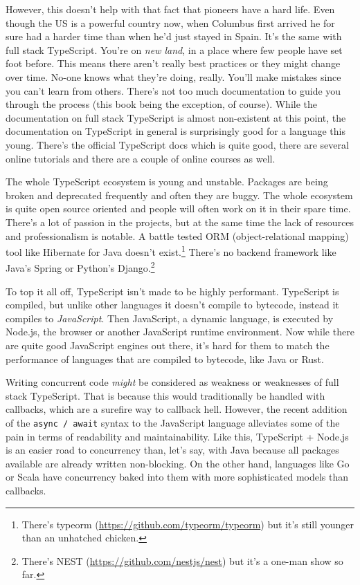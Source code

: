 \documentclass[12pt,a4paper]{report}
\begin{document}
However, this doesn't help with that fact that pioneers have a hard life. Even though the US is a powerful country now, when Columbus first arrived he for sure had a harder time than when he'd just stayed in Spain. It's the same with full stack TypeScript. You're on \textit{new land}, in a place where few people have set foot before. This means there aren't really best practices or they might change over time. No-one knows what they're doing, really. You'll make mistakes since you can't learn from others. There's not too much documentation to guide you through the process (this book being the exception, of course). While the documentation on full stack TypeScript is almost non-existent at this point, the documentation on TypeScript in general is surprisingly good for a language this young. There's the official TypeScript docs which is quite good, there are several online tutorials and there are a couple of online courses as well.

The whole TypeScript ecosystem is young and unstable. Packages are being broken and deprecated frequently and often they are buggy. The whole ecosystem is quite open source oriented and people will often work on it in their spare time. There's a lot of passion in the projects, but at the same time the lack of resources and professionalism is notable. A battle tested ORM (object-relational mapping) tool like Hibernate for Java doesn't exist.\footnote{There's typeorm (\url{https://github.com/typeorm/typeorm}) but it's still younger than an unhatched chicken.} There's no backend framework like Java's Spring or Python's Django.\footnote{There's NEST (\url{https://github.com/nestjs/nest}) but it's a one-man show so far.}

To top it all off, TypeScript isn't made to be highly performant. TypeScript is compiled, but unlike other languages it doesn't compile to bytecode, instead it compiles to \textit{JavaScript}. Then JavaScript, a dynamic language, is executed by Node.js, the browser or another JavaScript runtime environment. Now while there are quite good JavaScript engines out there, it's hard for them to match the performance of languages that are compiled to bytecode, like Java or Rust.

Writing concurrent code \textit{might} be considered as weakness or weaknesses of full stack TypeScript. That is because this would traditionally be handled with callbacks, which are a surefire way to callback hell. However, the recent addition of the \texttt{async / await} syntax to the JavaScript language alleviates some of the pain in terms of readability and maintainability. Like this, TypeScript + Node.js is an easier road to concurrency than, let's say, with Java because all packages available are already written non-blocking. On the other hand, languages like Go or Scala have concurrency baked into them with more sophisticated models than callbacks. 
\end{document}

